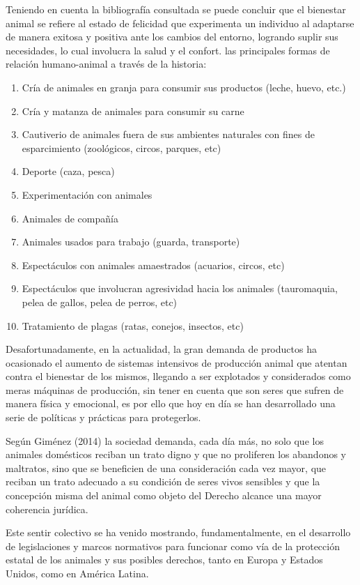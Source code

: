 Teniendo en cuenta la bibliografía consultada se puede concluir que el bienestar animal se refiere al estado de felicidad que experimenta un individuo al adaptarse de manera exitosa y positiva ante los cambios del entorno, logrando suplir sus necesidades, lo cual involucra la salud y el confort. las principales formas de relación humano-animal a través de la historia:
\begin{enumerate}
	\item Cría de animales en granja para consumir sus productos (leche, huevo, etc.)
\item  Cría y matanza de animales para consumir su carne
\item  Cautiverio de animales fuera de sus ambientes naturales con fines de esparcimiento (zoológicos, circos, parques, etc)
\item  Deporte (caza, pesca)
\item  Experimentación con animales
\item  Animales de compañía
\item  Animales usados para trabajo (guarda, transporte)
\item  Espectáculos con animales amaestrados (acuarios, circos, etc)
\item  Espectáculos que involucran agresividad hacia los animales (tauromaquia, pelea de gallos, pelea de perros, etc)
\item  Tratamiento de plagas (ratas, conejos, insectos, etc)

\end{enumerate}
Desafortunadamente, en la actualidad, la gran demanda de productos ha ocasionado el aumento de sistemas intensivos de producción animal que atentan contra el bienestar de los mismos, llegando a ser explotados y considerados como meras máquinas de producción, sin tener en cuenta que son seres que sufren de manera física y emocional, es por ello que hoy en día se han desarrollado una serie de políticas y prácticas para protegerlos. 

Según Giménez (2014) la sociedad demanda, cada día más, no solo que los animales domésticos reciban un trato digno y que no proliferen los abandonos y maltratos, sino que se beneficien de una consideración cada vez mayor, que reciban un trato adecuado a su condición de seres vivos sensibles y que la concepción misma del animal como objeto del Derecho alcance una mayor coherencia jurídica.  

Este sentir colectivo se ha venido mostrando, fundamentalmente, en el desarrollo de legislaciones y marcos normativos para funcionar como vía de la protección estatal de los animales y sus posibles derechos, tanto en Europa y Estados Unidos, como en América Latina.  

